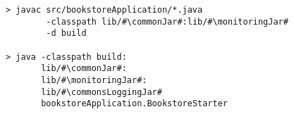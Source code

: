 \begin{lstlisting}[caption=Command to compile and run the instrumented Bookstore under Linux]
> javac src/bookstoreApplication/*.java
        -classpath lib/#\commonJar#:lib/#\monitoringJar#
        -d build

> java -classpath build:
       lib/#\commonJar#:
       lib/#\monitoringJar#:
       lib/#\commonsLoggingJar#
       bookstoreApplication.BookstoreStarter 
\end{lstlisting}

